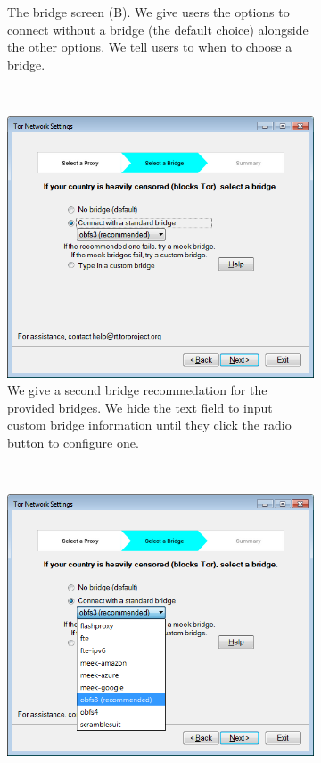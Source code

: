 \documentclass[USenglish,oneside,twocolumn]{article}
\begin{document}
\begin{figure}
\begin{subfigure}[b]{0.30\textwidth}
	\centering\captionsetup{width=1.5\linewidth}%
	\caption{The bridge screen (B). We give users the options to connect  without a bridge (the default choice) alongside the other options. We tell users to when to choose a bridge. }
	\label{fig:new-nobridge}
\end{subfigure}
~~~~~~~~~~~~~~~~~~~~~~~~~
\begin{subfigure}[b]{0.30\textwidth}
	\includegraphics[width=\textwidth]{screenshots/NEW-bridgeSettings-default.png}
	\centering\captionsetup{width=1.5\linewidth}%
	\caption{We give a second bridge recommedation for the provided bridges. We hide the text field to input custom bridge information until they click the radio button to configure one.}
	\label{fig:new-bridge}
\end{subfigure}
~~~~~~~~~~
\begin{subfigure}[b]{0.30\textwidth}
	\includegraphics[width=\textwidth]{screenshots/NEW-bridgeSettings-combobox.png}

\end{subfigure}
\end{figure}
\end{document}
